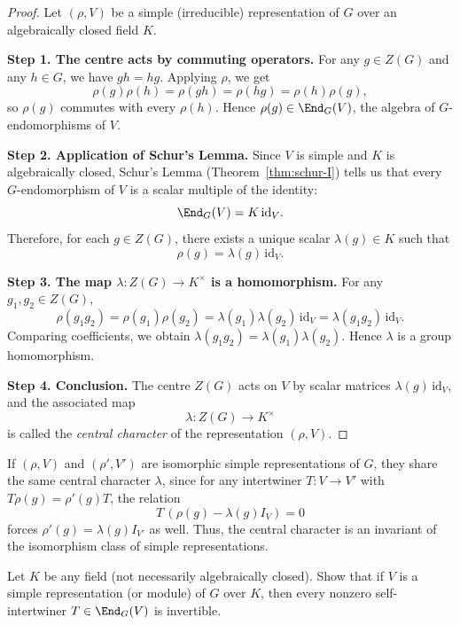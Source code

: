 \begin{proof}
Let $(\rho,V)$ be a simple (irreducible) representation of $G$ over an algebraically closed field $K$.

\smallskip
\noindent\textbf{Step 1. The centre acts by commuting operators.}
For any $g\in Z(G)$ and any $h\in G$, we have $gh=hg$. Applying $\rho$, we get
\[
\rho(g)\rho(h)=\rho(gh)=\rho(hg)=\rho(h)\rho(g),
\]
so $\rho(g)$ commutes with every $\rho(h)$.
Hence $\rho(g)\in\End_G(V)$, the algebra of $G$-endomorphisms of $V$.

\smallskip
\noindent\textbf{Step 2. Application of Schur’s Lemma.}
Since $V$ is simple and $K$ is algebraically closed, Schur’s Lemma
(Theorem~\ref{thm:schur-I}) tells us that every $G$-endomorphism of $V$ is a scalar multiple of the identity:
\[
\End_G(V) = K\,\mathrm{id}_V.
\]
Therefore, for each $g\in Z(G)$, there exists a unique scalar $\lambda(g)\in K$ such that
\[
\rho(g)=\lambda(g)\,\mathrm{id}_V.
\]

\smallskip
\noindent\textbf{Step 3. The map $\lambda:Z(G)\to K^\times$ is a homomorphism.}
For any $g_1,g_2\in Z(G)$,
\[
\rho(g_1g_2)
  = \rho(g_1)\rho(g_2)
  = \lambda(g_1)\lambda(g_2)\,\mathrm{id}_V
  = \lambda(g_1g_2)\,\mathrm{id}_V.
\]
Comparing coefficients, we obtain $\lambda(g_1g_2)=\lambda(g_1)\lambda(g_2)$.
Hence $\lambda$ is a group homomorphism.

\smallskip
\noindent\textbf{Step 4. Conclusion.}
The centre $Z(G)$ acts on $V$ by scalar matrices $\lambda(g)\,\mathrm{id}_V$,
and the associated map
\[
\lambda:Z(G)\longrightarrow K^\times
\]
is called the \emph{central character} of the representation $(\rho,V)$.
\end{proof}

\begin{remark}
If $(\rho,V)$ and $(\rho',V')$ are isomorphic simple representations of $G$,
they share the same central character $\lambda$, since for any intertwiner
$T:V\to V'$ with $T\rho(g)=\rho'(g)T$, the relation
\[
T\,(\rho(g)-\lambda(g)I_V)=0
\]
forces $\rho'(g)=\lambda(g)I_{V'}$ as well.
Thus, the central character is an invariant of the isomorphism class of simple representations.
\end{remark}


\begin{exercise}\label{ex:schur-arbitrary}
Let $K$ be any field (not necessarily algebraically closed).
Show that if $V$ is a simple representation (or module) of $G$ over $K$,
then every nonzero self-intertwiner $T\in\End_G(V)$ is invertible.
\end{exercise}

